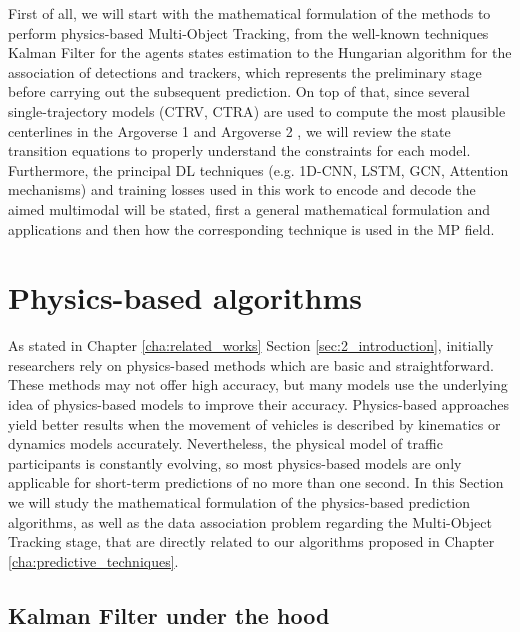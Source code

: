 First of all, we will start with the mathematical formulation of the methods to perform physics-based Multi-Object Tracking, from the well-known techniques Kalman Filter \cite{kalman1960new} for the agents states estimation to the Hungarian algorithm \cite{kuhn1955hungarian} for the association of detections and trackers, which represents the preliminary stage before carrying out the subsequent prediction. On top of that, since several single-trajectory models (\ac{CTRV}, \ac{CTRA}) are used to compute the most plausible centerlines in the Argoverse 1 \cite{chang2019argoverse} and Argoverse 2 \cite{wilson2023argoverse}, we will review the state transition equations to properly understand the constraints for each model. Furthermore, the principal \ac{DL} techniques (e.g. 1D-CNN, LSTM, GCN, Attention mechanisms) and training losses used in this work to encode and decode the aimed multimodal will be stated, first a general mathematical formulation and applications and then how the corresponding technique is used in the \ac{MP} field.

\section{Physics-based algorithms}
\label{sec:3_pb_formulation}


As stated in Chapter \ref{cha:related_works} Section \ref{sec:2_introduction}, initially researchers rely on physics-based methods which are basic and straightforward. These methods may not offer high accuracy, but many models use the underlying idea of physics-based models to improve their accuracy. Physics-based approaches yield better results when the movement of vehicles is described by kinematics or dynamics models accurately. Nevertheless, the physical model of traffic participants is constantly evolving, so most physics-based models are only applicable for short-term predictions of no more than one second. In this Section we will study the mathematical formulation of the physics-based prediction algorithms, as well as the data association problem regarding the Multi-Object Tracking stage, that are directly related to our algorithms proposed in Chapter \ref{cha:predictive_techniques}.

\subsection{Kalman Filter under the hood}
\label{subsec:3_kf_formulation}

